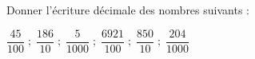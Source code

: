 \begin{exercice}
    Donner l'écriture décimale des nombres suivants :
    \begin{center}
       $\dfrac{45}{100} \; ; \; \dfrac{186}{10} \; ; \; \dfrac{5}{\num{1 000}} \; ; \; \dfrac{\num{6 921}}{100} \; ; \; \dfrac{850}{10} \; ; \; \dfrac{204}{\num{1 000}}$
    \end{center}
 \end{exercice}